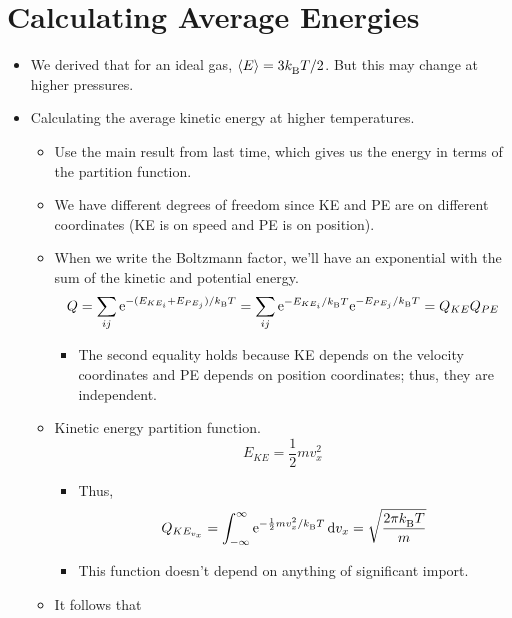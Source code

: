 \documentclass[../notes.tex]{subfiles}
\begin{document}
\section{Calculating Average Energies}
\begin{itemize}
    \item {}We derived that for an ideal gas, $\prb{E}=3\kB T/2$. But this may change at higher pressures.
    \item Calculating the average kinetic energy at higher temperatures.
    \begin{itemize}
        \item Use the main result from last time, which gives us the energy in terms of the partition function.
        \item We have different degrees of freedom since KE and PE are on different coordinates (KE is on speed and PE is on position).
        \item When we write the Boltzmann factor, we'll have an exponential with the sum of the kinetic and potential energy.
        \begin{equation*}
            Q = \sum_{ij}\e[-(E_{KE_i}+E_{PE_j})/\kB T]
            = \sum_{ij}\e[-E_{KE_i}/\kB T]\e[-E_{PE_j}/\kB T]
            = Q_{KE}Q_{PE}
        \end{equation*}
        \begin{itemize}
            \item The second equality holds because KE depends on the velocity coordinates and PE depends on position coordinates; thus, they are independent.
        \end{itemize}
        \item Kinetic energy partition function.
        \begin{equation*}
            E_{KE} = \frac{1}{2}mv_x^2
        \end{equation*}
        \begin{itemize}
            \item Thus,
            \begin{equation*}
                Q_{KE_{v_x}} = \int_{-\infty}^\infty\e[-\frac{1}{2}mv_x^2/\kB T]\dd{v_x} = \sqrt{\frac{2\pi \kB T}{m}}
            \end{equation*}
            \item This function doesn't depend on anything of significant import.
        \end{itemize}
        \item It follows that
        \begin{equation*}

\end{equation*}
\end{itemize}
\end{itemize}
\end{document}
